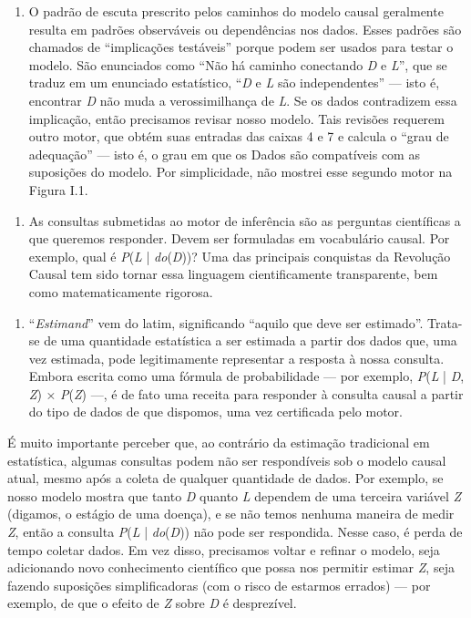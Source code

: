 \documentclass[11pt,a5paper,twoside]{book}
\begin{document}
\begin{enumerate}
\item O padrão de escuta prescrito pelos caminhos do modelo causal geralmente resulta em padrões observáveis ou dependências nos dados. Esses padrões são chamados de “implicações testáveis” porque podem ser usados para testar o modelo. São enunciados como “Não há caminho conectando \textit{D} e \textit{L}”, que se traduz em um enunciado estatístico, “\textit{D} e \textit{L} são independentes” — isto é, encontrar \textit{D} não muda a verossimilhança de \textit{L}. Se os dados contradizem essa implicação, então precisamos revisar nosso modelo. Tais revisões requerem outro motor, que obtém suas entradas das caixas 4 e 7 e calcula o “grau de adequação” — isto é, o grau em que os Dados são compatíveis com as suposições do modelo. Por simplicidade, não mostrei esse segundo motor na Figura I.1.
\end{enumerate}
\begin{enumerate}
\item As consultas submetidas ao motor de inferência são as perguntas científicas a que queremos responder. Devem ser formuladas em vocabulário causal. Por exemplo, qual é \textit{P}(\textit{L} | \textit{do}(\textit{D}))? Uma das principais conquistas da Revolução Causal tem sido tornar essa linguagem cientificamente transparente, bem como matematicamente rigorosa.
\end{enumerate}
\begin{enumerate}
\item “\textit{Estimand}” vem do latim, significando “aquilo que deve ser estimado”. Trata-se de uma quantidade estatística a ser estimada a partir dos dados que, uma vez estimada, pode legitimamente representar a resposta à nossa consulta. Embora escrita como uma fórmula de probabilidade — por exemplo, \textit{P}(\textit{L} | \textit{D}, \textit{Z}) × \textit{P}(\textit{Z}) —, é de fato uma receita para responder à consulta causal a partir do tipo de dados de que dispomos, uma vez certificada pelo motor.
\end{enumerate}
É muito importante perceber que, ao contrário da estimação tradicional em estatística, algumas consultas podem não ser respondíveis sob o modelo causal atual, mesmo após a coleta de qualquer quantidade de dados. Por exemplo, se nosso modelo mostra que tanto \textit{D} quanto \textit{L} dependem de uma terceira variável \textit{Z} (digamos, o estágio de uma doença), e se não temos nenhuma maneira de medir \textit{Z}, então a consulta \textit{P}(\textit{L} | \textit{do}(\textit{D})) não pode ser respondida. Nesse caso, é perda de tempo coletar dados. Em vez disso, precisamos voltar e refinar o modelo, seja adicionando novo conhecimento científico que possa nos permitir estimar \textit{Z}, seja fazendo suposições simplificadoras (com o risco de estarmos errados) — por exemplo, de que o efeito de \textit{Z} sobre \textit{D} é desprezível.
\end{document}
